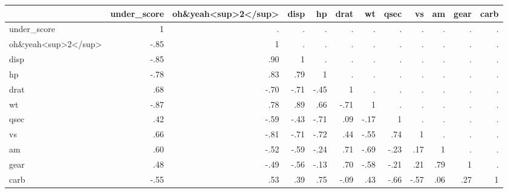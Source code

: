 \begin{table}
\centering
\begin{tabular}[t]{lrrrrrrrrrrr}
\toprule
  & under\_score & oh\&yeah<sup>2</sup> & disp & hp & drat & wt & qsec & vs & am & gear & carb\\
\midrule
under\_score & 1 & . & . & . & . & . & . & . & . & . & .\\
oh\&yeah<sup>2</sup> & -.85 & 1 & . & . & . & . & . & . & . & . & .\\
disp & -.85 & .90 & 1 & . & . & . & . & . & . & . & .\\
hp & -.78 & .83 & .79 & 1 & . & . & . & . & . & . & .\\
drat & .68 & -.70 & -.71 & -.45 & 1 & . & . & . & . & . & .\\
wt & -.87 & .78 & .89 & .66 & -.71 & 1 & . & . & . & . & .\\
qsec & .42 & -.59 & -.43 & -.71 & .09 & -.17 & 1 & . & . & . & .\\
vs & .66 & -.81 & -.71 & -.72 & .44 & -.55 & .74 & 1 & . & . & .\\
am & .60 & -.52 & -.59 & -.24 & .71 & -.69 & -.23 & .17 & 1 & . & .\\
gear & .48 & -.49 & -.56 & -.13 & .70 & -.58 & -.21 & .21 & .79 & 1 & .\\
carb & -.55 & .53 & .39 & .75 & -.09 & .43 & -.66 & -.57 & .06 & .27 & 1\\
\bottomrule
\end{tabular}
\end{table}
